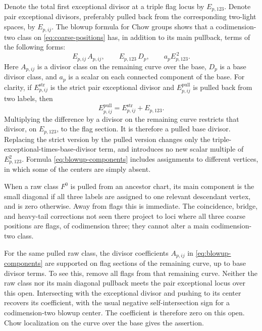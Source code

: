 Denote the total first exceptional divisor at a triple flag locus by
$E_{p,123}$.  Denote pair exceptional divisors, preferably pulled back
from the corresponding two-light spaces, by $E_{p,ij}$.
The blowup formula for Chow groups \cite[Proposition~6.7(e)]{Fulton} shows that a
codimension-two class on \eqref{eq:coarse-positions} has, in addition to
its main pullback, terms of the following forms:
\begin{equation}\label{eq:blowup-components}
 E_{p,ij}\,A_{p,ij},\qquad
 E_{p,123}\,D_p,\qquad
 a_p E_{p,123}^{\,2}.
\end{equation}
Here $A_{p,ij}$ is a divisor class on the remaining curve over the
base, $D_p$ is a base divisor class, and $a_p$ is a scalar on each
connected component of the base.  For clarity, if \(E_{p,ij}^{\mathrm{str}}\) is the strict pair
exceptional divisor and \(E_{p,ij}^{\mathrm{pull}}\) is pulled back
from two labels, then
\[
 E_{p,ij}^{\mathrm{pull}}
   =E_{p,ij}^{\mathrm{str}}+E_{p,123}.
\]
Multiplying the difference by a divisor on the remaining curve
restricts that divisor, on \(E_{p,123}\), to the flag section.
It is therefore a pulled base divisor. Replacing the strict version
by the pulled version changes only the
triple-exceptional-times-base-divisor term, and introduces no new
scalar multiple of \(E_{p,123}^2\).  Formula
\eqref{eq:blowup-components} includes assignments to different
vertices, in which some of the centers are simply absent.

When a raw class $F^0$ is pulled from an ancestor chart, its main
component is the small diagonal if all three labels are assigned to
one relevant descendant vertex, and is zero otherwise.  Away from
flags this is immediate.  The coincidence, bridge, and heavy-tail
corrections not seen there project to loci where all three coarse
positions are flags, of codimension three; they cannot alter a main
codimension-two class.

For the same pulled raw class, the divisor coefficients $A_{p,ij}$ in
\eqref{eq:blowup-components} are supported on flag sections of the
remaining curve, up to base divisor terms.  To see this, remove all
flags from that remaining curve.  Neither the raw class nor its main
diagonal pullback meets the pair exceptional locus over this open.
Intersecting with the exceptional divisor and pushing to its center
recovers its coefficient, with the usual negative self-intersection
sign for a codimension-two blowup center.  The coefficient is
therefore zero on this open.  Chow localization on the curve over the
base gives the assertion.

